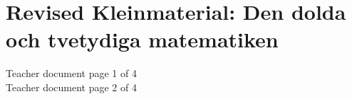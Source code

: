 \newpage
\section{Revised Kleinmaterial: Den dolda och tvetydiga matematiken}
\label{app:case2}
Teacher document page 1 of 4\\
\newpage
Teacher document page 2 of 4\\
